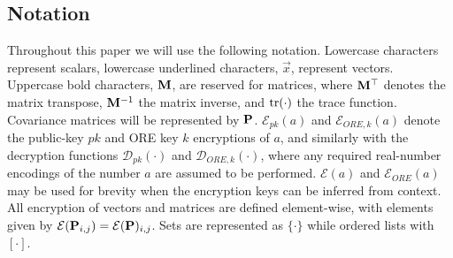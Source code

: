 \documentclass[letterpaper, 10 pt, conference]{ieeeconf}  %
\begin{document}
\subsection{Notation}
Throughout this paper we will use the following notation. Lowercase characters represent scalars, lowercase underlined characters, $\vec{x}$, represent vectors. Uppercase bold characters, ${{\mathbf{M}}}$, are reserved for matrices, where ${{\mathbf{M}}}^\top$ denotes the matrix transpose, ${{\mathbf{M}}}^{-1}$ the matrix inverse, and $\operatorname{tr}(\cdot)$ the trace function. Covariance matrices will be represented by ${{\mathbf{P}}}$. $\mathcal{E}_{pk}(a)$ and $\mathcal{E}_{ORE,k}(a)$ denote the public-key $pk$ and ORE key $k$ encryptions of $a$, and similarly with the decryption functions $\mathcal{D}_{pk}(\cdot)$ and $\mathcal{D}_{ORE,k}(\cdot)$, where any required real-number encodings of the number $a$ are assumed to be performed. $\mathcal{E}(a)$ and $\mathcal{E}_{ORE}(a)$ may be used for brevity when the encryption keys can be inferred from context. All encryption of vectors and matrices are defined element-wise, with elements given by $\mathcal{E}({{\mathbf{P}}}_{i,j}) = \mathcal{E}({{\mathbf{P}}})_{i,j}$. Sets are represented as $\{\cdot\}$ while ordered lists with $[\cdot]$.

\end{document}
